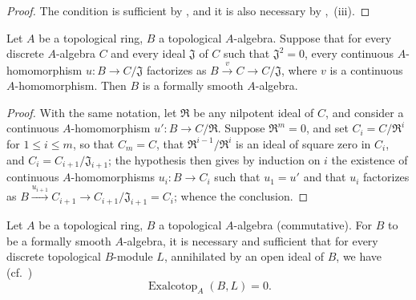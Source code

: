 \begin{proof}
The condition is sufficient by , and it is also necessary by ,~(iii).
\end{proof}

\begin{proposition}[19.4.3]
\label{0.19.4.3}
Let $A$ be a topological ring, $B$ a topological $A$-algebra.
Suppose that for every discrete $A$-algebra $C$ and every ideal $\mathfrak{J}$ of $C$ such that $\mathfrak{J}^2=0$, every continuous $A$-homomorphism $u:B\to C/\mathfrak{J}$ factorizes as $B\xrightarrow{v}C\to C/\mathfrak{J}$, where $v$ is a continuous $A$-homomorphism.
Then $B$ is a formally smooth $A$-algebra.
\end{proposition}

\begin{proof}
With the same notation, let $\mathfrak{R}$ be any nilpotent ideal of $C$,
and consider a continuous $A$-homomorphism $u':B\to C/\mathfrak{R}$.
Suppose $\mathfrak{R}^m=0$, and set $C_i=C/\mathfrak{R}^i$ for $1\leq i\leq m$, so that $C_m=C$, that $\mathfrak{R}^{i-1}/\mathfrak{R}^i$ is an ideal of square zero in $C_i$, and $C_i=C_{i+1}/\mathfrak{J}_{i+1}$;
the hypothesis then gives by induction on $i$ the existence of continuous $A$-homomorphisms $u_i:B\to C_i$ such that $u_1=u'$ and that $u_i$ factorizes as $B\xrightarrow{u_{i+1}}C_{i+1}\to C_{i+1}/\mathfrak{J}_{i+1}=C_i$;
whence the conclusion.
\end{proof}

\begin{proposition}[19.4.4]
\label{0.19.4.4}
Let $A$ be a topological ring, $B$ a topological $A$-algebra (commutative).
For $B$ to be a formally smooth $A$-algebra, it is necessary and sufficient that for
every discrete topological $B$-module $L$, annihilated by an open ideal of $B$, we have (cf.~)
\[
  \operatorname{Exalcotop}_A(B,L)=0.
\]
\end{proposition}

